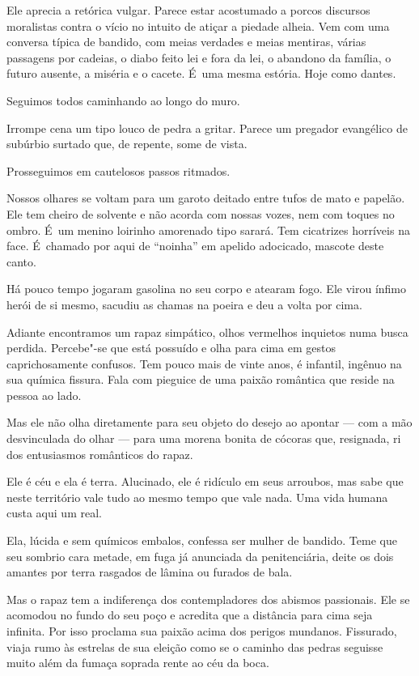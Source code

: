 Ele aprecia a retórica vulgar. Parece estar acostumado a porcos
discursos moralistas contra o vício no intuito de atiçar a piedade
alheia. Vem com uma conversa típica de bandido, com meias verdades e
meias mentiras, várias passagens por cadeias, o diabo feito lei e fora
da lei, o abandono da família, o futuro ausente, a miséria e o cacete. É~uma mesma estória. Hoje como dantes.

\asterisc{}

Seguimos todos caminhando ao longo do muro.

Irrompe cena um tipo louco de pedra a gritar. Parece um pregador
evangélico de subúrbio surtado que, de repente, some de vista.

Prosseguimos em cautelosos passos ritmados.

\asterisc{}

Nossos olhares se voltam para um garoto deitado entre tufos de mato e
papelão. Ele tem cheiro de solvente e não acorda com nossas vozes, nem
com toques no ombro. É~um menino loirinho amorenado tipo sarará. Tem
cicatrizes horríveis na face. É~chamado por aqui de ``noinha'' em
apelido adocicado, mascote deste canto.

Há pouco tempo jogaram gasolina no seu corpo e atearam fogo. Ele virou
ínfimo herói de si mesmo, sacudiu as chamas na poeira e deu a volta por
cima.

Adiante encontramos um rapaz simpático, olhos vermelhos inquietos numa
busca perdida. Percebe"-se que está possuído e olha para cima em gestos
caprichosamente confusos. Tem pouco mais de vinte anos, é infantil,
ingênuo na sua química fissura. Fala com pieguice de uma paixão
romântica que reside na pessoa ao lado.

Mas ele não olha diretamente para seu objeto do desejo ao apontar ---
com a mão desvinculada do olhar --- para uma morena bonita de cócoras
que, resignada, ri dos entusiasmos românticos do rapaz.

Ele é céu e ela é terra. Alucinado, ele é ridículo em seus arroubos, mas
sabe que neste território vale tudo ao mesmo tempo que vale nada. Uma
vida humana custa aqui um real.

Ela, lúcida e sem químicos embalos, confessa ser mulher de bandido. Teme
que seu sombrio cara metade, em fuga já anunciada da penitenciária,
deite os dois amantes por terra rasgados de lâmina ou furados de bala.

Mas o rapaz tem a indiferença dos contempladores dos abismos passionais.
Ele se acomodou no fundo do seu poço e acredita que a distância para
cima seja infinita. Por isso proclama sua paixão acima dos perigos
mundanos. Fissurado, viaja rumo às estrelas de sua eleição como se o
caminho das pedras seguisse muito além da fumaça soprada rente ao céu da
boca.

